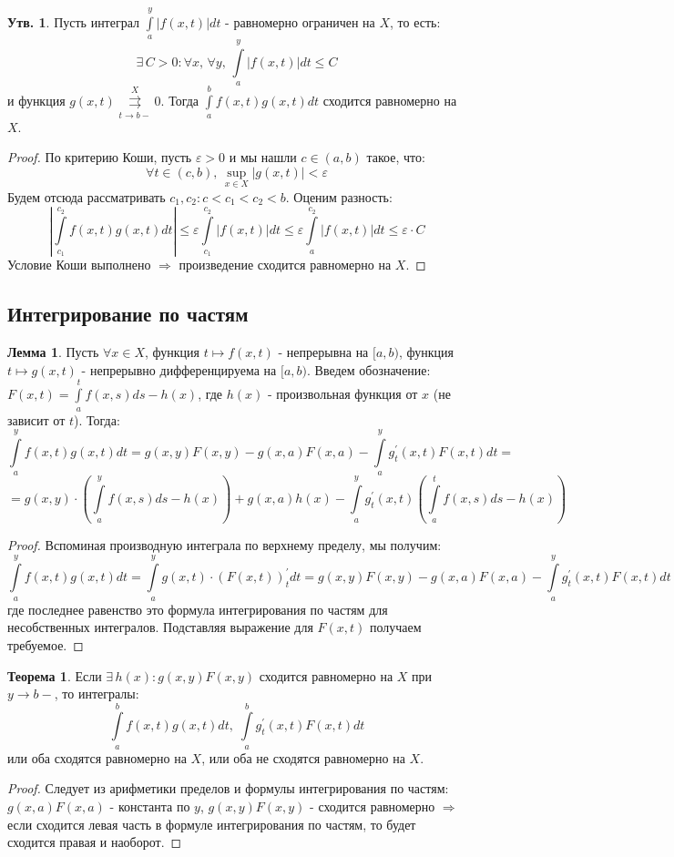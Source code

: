 \documentclass[12pt]{article}
\newcommand{\VE}{\varepsilon}
\theoremstyle{definition}
\newtheorem{prop}{Утв.}
\newtheorem{lemma}{Лемма}
\newtheorem{theorem}{Теорема}
\newcommand{\ddint}[2]{\displaystyle\int\limits_{#1}^{#2}}
\newcommand{\uconvm}[2]{\overset{#1}{\underset{#2}{\rightrightarrows}}}
\begin{document}
\begin{prop}
	Пусть интеграл $\ddint{a}{y}|f(x,t)|dt$ - равномерно ограничен на $X$, то есть:
	$$
		\exists \, C > 0 \colon \forall x, \, \forall y, \, \ddint{a}{y}|f(x,t)|dt \leq C
	$$
	и функция $g(x,t) \uconvm{X}{t \to b-} 0$. Тогда $\ddint{a}{b}f(x,t)g(x,t)dt$ сходится равномерно на $X$.
\end{prop}
\begin{proof}
	По критерию Коши, пусть $\VE > 0$ и мы нашли $c \in (a,b)$ такое, что:
	$$
		\forall t \in (c,b), \, \sup\limits_{x \in X}|g(x,t)| < \VE
	$$
	Будем отсюда рассматривать $c_1, c_2 \colon c < c_1 < c_2 < b$.
	Оценим разность:
	$$
		\left|\ddint{c_1}{c_2}f(x,t)g(x,t)dt\right| \leq \VE \ddint{c_1}{c_2}|f(x,t)|dt \leq \VE \ddint{a}{c_2}|f(x,t)|dt \leq \VE {\cdot}C
	$$
	Условие Коши выполнено $\Rightarrow$ произведение сходится равномерно на $X$.
\end{proof}

\subsection*{Интегрирование по частям}

\begin{lemma}
	Пусть $\forall x \in X$, функция $t \mapsto f(x,t)$ - непрерывна на $[a,b)$, функция $t \mapsto g(x,t)$ - непрерывно дифференцируема на $[a,b)$. Введем обозначение: $F(x,t) = \ddint{a}{t}f(x,s)ds - h(x)$, где $h(x)$ - произвольная функция от $x$ (не зависит от $t$). Тогда:
	$$
		\ddint{a}{y}f(x,t)g(x,t)dt = g(x,y)F(x,y) - g(x,a)F(x,a) - \ddint{a}{y}g_t^\prime(x,t)F(x,t)dt =
	$$
	$$
		= g(x,y){\cdot}\left(\ddint{a}{y}f(x,s)ds - h(x)\right) + g(x,a)h(x) - \ddint{a}{y}g_t^\prime(x,t)\left(\ddint{a}{t}f(x,s)ds - h(x)\right)
	$$
\end{lemma}
\begin{proof}
	Вспоминая производную интеграла по верхнему пределу, мы получим:
	$$
		\ddint{a}{y}f(x,t)g(x,t)dt = \ddint{a}{y}g(x,t){\cdot}\left(F(x,t)\right)_t^\prime dt = g(x,y)F(x,y) - g(x,a)F(x,a) - \ddint{a}{y}g_t^\prime(x,t)F(x,t)dt
	$$
	где последнее равенство это формула интегрирования по частям для несобственных интегралов. Подставляя выражение для $F(x,t)$ получаем требуемое.
\end{proof}

\begin{theorem}
	Если $\exists\, h(x) \colon g(x,y)F(x,y)$ сходится равномерно на $X$ при $y \to b-$, то интегралы: 
	$$	
		\ddint{a}{b}f(x,t)g(x,t)dt, \; \ddint{a}{b}g_t^\prime(x,t)F(x,t)dt
	$$
	или оба сходятся равномерно на $X$, или оба не сходятся равномерно на $X$.
\end{theorem}
\begin{proof}
	Следует из арифметики пределов и формулы интегрирования по частям: $g(x,a)F(x,a)$ - константа по $y$, $g(x,y)F(x,y)$ - сходится равномерно $\Rightarrow$ если сходится левая часть в формуле интегрирования по частям, то будет сходится правая и наоборот.
\end{proof}
\end{document}
